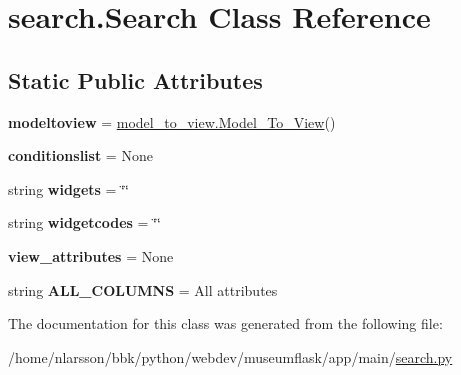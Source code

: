 \hypertarget{classsearch_1_1Search}{}\section{search.\+Search Class Reference}
\label{classsearch_1_1Search}
\subsection*{Static Public Attributes}
\begin{DoxyCompactItemize}
\item 
\mbox{\label{classsearch_1_1Search_a0077377057bcc63c81fc15e5a5259564}} 
{\bfseries modeltoview} = \mbox{\hyperlink{classmodel__to__view_1_1Model__To__View}{model\+\_\+to\+\_\+view.\+Model\+\_\+\+To\+\_\+\+View}}()
\item 
\mbox{\label{classsearch_1_1Search_a16ea0f7fb10f3ff0e3746e362322f2c1}} 
{\bfseries conditionslist} = None
\item 
\mbox{\label{classsearch_1_1Search_a5910212ded0ed49407a3fe8b542fe1b6}} 
string {\bfseries widgets} = \char`\"{}\char`\"{}
\item 
\mbox{\label{classsearch_1_1Search_ae4f0d935fb033a150cf46a2b04e8f262}} 
string {\bfseries widgetcodes} = \char`\"{}\char`\"{}
\item 
\mbox{\label{classsearch_1_1Search_a8be1bc0a24af95b6b72565bc5aef03ed}} 
{\bfseries view\+\_\+attributes} = None
\item 
\mbox{\label{classsearch_1_1Search_a20e662af2f3688e030b8cd3d534903dc}} 
string {\bfseries A\+L\+L\+\_\+\+C\+O\+L\+U\+M\+NS} = \textquotesingle{}All attributes\textquotesingle{}
\end{DoxyCompactItemize}


The documentation for this class was generated from the following file\+:\begin{DoxyCompactItemize}
\item 
/home/nlarsson/bbk/python/webdev/museumflask/app/main/\mbox{\hyperlink{search_8py}{search.\+py}}\end{DoxyCompactItemize}
